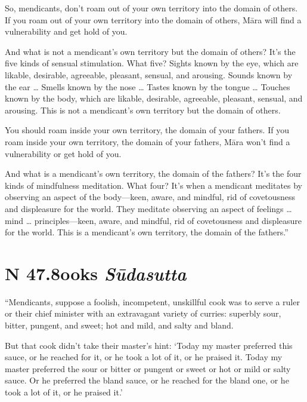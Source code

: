\documentclass[12pt,openany]{book}%
\newcommand*{\suttatitleacronym}[1]{\smaller[2]{#1}\vspace*{.3em}}
\newcommand*{\suttatitletranslation}[1]{\linebreak{#1}}
\newcommand*{\suttatitleroot}[1]{\linebreak\smaller[2]\itshape{#1}}
\newcommand*{\tocacronym}[1]{\hspace*{-3.3em}{#1}\quad}
\newcommand*{\toctranslation}[1]{#1}
\newcommand*{\tocroot}[1]{(\textit{#1})}
\begin{document}
So, mendicants, don’t roam out of your own territory into the domain of others. If you roam out of your own territory into the domain of others, \textsanskrit{Māra} will find a vulnerability and get hold of you. 

And what is not a mendicant’s own territory but the domain of others? It’s the five kinds of sensual stimulation. What five? Sights known by the eye, which are likable, desirable, agreeable, pleasant, sensual, and arousing. Sounds known by the ear … Smells known by the nose … Tastes known by the tongue … Touches known by the body, which are likable, desirable, agreeable, pleasant, sensual, and arousing. This is not a mendicant’s own territory but the domain of others. 

You should roam inside your own territory, the domain of your fathers. If you roam inside your own territory, the domain of your fathers, \textsanskrit{Māra} won’t find a vulnerability or get hold of you. 

And what is a mendicant’s own territory, the domain of the fathers? It’s the four kinds of mindfulness meditation. What four? It’s when a mendicant meditates by observing an aspect of the body—keen, aware, and mindful, rid of covetousness and displeasure for the world. They meditate observing an aspect of feelings … mind … principles—keen, aware, and mindful, rid of covetousness and displeasure for the world. This is a mendicant’s own territory, the domain of the fathers.” 

%
\section*{{\suttatitleacronym SN 47.8}{\suttatitletranslation Cooks }{\suttatitleroot Sūdasutta}}
\addcontentsline{toc}{section}{\tocacronym{SN 47.8} \toctranslation{Cooks } \tocroot{Sūdasutta}}

“Mendicants, suppose a foolish, incompetent, unskillful cook was to serve a ruler or their chief minister with an extravagant variety of curries: superbly sour, bitter, pungent, and sweet; hot and mild, and salty and bland. 

But that cook didn’t take their master’s hint: ‘Today my master preferred this sauce, or he reached for it, or he took a lot of it, or he praised it. Today my master preferred the sour or bitter or pungent or sweet or hot or mild or salty sauce. Or he preferred the bland sauce, or he reached for the bland one, or he took a lot of it, or he praised it.’ 
\end{document}
